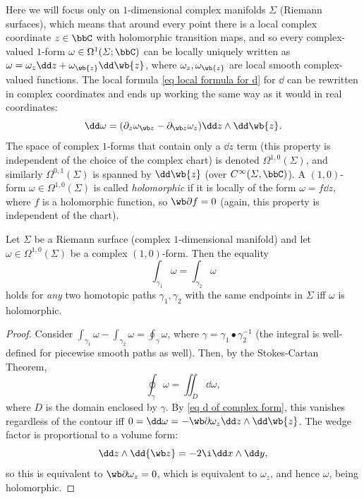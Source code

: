 \begin{rem}
    Here we will focus only on $1$-dimensional complex manifolds $\varSigma$ (Riemann surfaces), which means that around every point there is a local complex coordinate $z\in \bbC$ with holomorphic transition maps, and so every complex-valued $1$-form $\omega\in\Omega^1(\varSigma;\bbC)$ can be locally uniquely written as $\omega=\omega_z \dd z+\omega_{\wb{z}} \dd \wb{z}$, where $\omega_z,\omega_{\wb{z}}$ are local smooth complex-valued functions.
    The local formula \eqref{eq local formula for d} for $\dd$ can be rewritten in complex coordinates and ends up working the same way as it would in real coordinates:
    \[\dd\omega=(\partial_{z} \omega_{\wb z}-\partial_{\wb z} \omega_{z})\dd z\wedge \dd \wb{z}.\label{eq d of complex form}\]
    The space of complex $1$-forms that contain only a $\dd z$ term (this property is independent of the choice of the complex chart) is denoted $\Omega^{1,0}(\varSigma)$, and similarly $\Omega^{0,1}(\varSigma)$ is spanned by $\dd \wb{z}$ (over $C^\infty(\varSigma,\bbC)$). A $(1,0)$-form $\omega\in\Omega^{1,0}(\varSigma)$ is called \emph{holomorphic} if it is locally of the form $\omega=f\dd z$, where $f$ is a holomorphic function, so $\wb\partial f=0$ (again, this property is independent of the chart).
\end{rem}
\begin{cor}
    Let $\varSigma$ be a Riemann surface (complex $1$-dimensional manifold) and let $\omega\in\Omega^{1,0}(\varSigma)$ be a complex $(1,0)$-form. Then the equality
    \[\int_{\gamma_1}\omega=\int_{\gamma_2}\omega\]
    holds for \emph{any} two homotopic paths $\gamma_1,\gamma_2$ with the same endpoints in $\varSigma$ iff $\omega$ is holomorphic.
\end{cor}
\begin{proof}
    Consider $\int_{\gamma_1}\omega-\int_{\gamma_2}\omega=\oint_{\gamma}\omega$, where $\gamma=\gamma_1\bullet \gamma_2^{-1}$ (the integral is well-defined for piecewise smooth paths as well). Then, by the Stokes-Cartan Theorem, 
    \[\oint_\gamma \omega=\iint_D \dd\omega,\]
    where $D$ is the domain enclosed by $\gamma$.
    By \eqref{eq d of complex form}, this vanishes regardless of the contour iff $0=\dd \omega=-\wb\partial\omega_z \dd z\wedge\dd\wb{z}$. The wedge factor is proportional to a volume form:
    \[\dd z\wedge\dd {\wb z}=-2\i \dd x\wedge\dd y,\]
    so this is equivalent to $\wb\partial\omega_z=0$, which is equivalent to $\omega_z$, and hence $\omega$, being holomorphic.
\end{proof}

